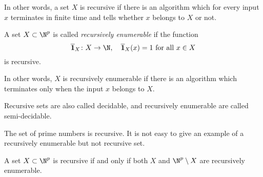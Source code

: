 \begin{page}
\setcounter{section}{3}
\setcounter{subsection}{4}
\setcounter{dfn}{26}
\label{portion:741}

In other words, a set $X$ is recursive if there is an algorithm which for every input $x$ terminates in finite time and tells whether $x$ belongs to $X$ or not.


\end{page}

\begin{page}
\setcounter{section}{3}
\setcounter{subsection}{4}
\setcounter{dfn}{27}
\label{portion:743}

\begin{dfn}
A set $X \subset \N^p$ is called \emph{recursively enumerable} if the function
\[
\overline{\mathbf{1}}_X \colon X \to \N, \quad \overline{\mathbf{1}}_X(x) = 1 \text{ for all }x \in X
\]
is recursive.
\end{dfn}

\end{page}

\begin{page}
\setcounter{section}{3}
\setcounter{subsection}{4}
\setcounter{dfn}{27}
\label{portion:744}

In other words, $X$ is recursively enumerable if there is an algorithm which terminates only when the input $x$ belongs to $X$.

Recursive sets are also called decidable, and recursively enumerable are called semi-decidable.


\end{page}

\begin{page}
\setcounter{section}{3}
\setcounter{subsection}{4}
\setcounter{dfn}{28}
\label{portion:746}

\begin{exl}
The set of prime numbers is recursive.
It is not easy to give an example of a recursively enumerable but not recursive set.
\end{exl}

\end{page}

\begin{page}
\setcounter{section}{3}
\setcounter{subsection}{4}
\setcounter{dfn}{29}
\label{portion:749}

\begin{lem}
A set $X \subset \N^p$ is recursive if and only if both $X$ and $\N^p \setminus X$ are recursively enumerable.
\end{lem}

\end{page}

